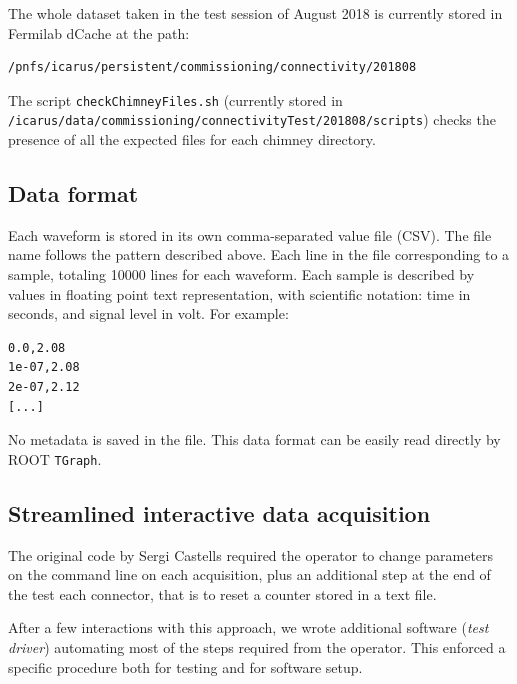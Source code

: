 The whole dataset taken in the test session of August 2018 is currently
stored in Fermilab dCache at the path:

\begin{verbatim}
/pnfs/icarus/persistent/commissioning/connectivity/201808
\end{verbatim}

The script \texttt{checkChimneyFiles.sh} (currently stored in
\texttt{/icarus/data/commissioning/connectivityTest/201808/scripts})
checks the presence of all the expected files for each chimney
directory.

\subsection{Data format}
\label{ssec:data-format}

Each waveform is stored in its own comma-separated value file (CSV). The
file name follows the pattern described above. Each line in the file
corresponding to a sample, totaling 10000 lines for each waveform. Each
sample is described by values in floating point text representation,
with scientific notation: time in seconds, and signal level in volt. For
example:

\begin{verbatim}
0.0,2.08
1e-07,2.08
2e-07,2.12
[...]
\end{verbatim}

No metadata is saved in the file. This data format can be easily read
directly by ROOT \texttt{TGraph}.

\subsection{Streamlined interactive data acquisition}
\label{ssec:streamlined-interactive-data-acquisition}

The original code by Sergi Castells required the operator to change
parameters on the command line on each acquisition, plus an additional
step at the end of the test each connector, that is to reset a counter
stored in a text file.

After a few interactions with this approach, we wrote additional
software (\emph{test driver}) automating most of the steps required from
the operator. This enforced a specific procedure both for testing and
for software setup.

